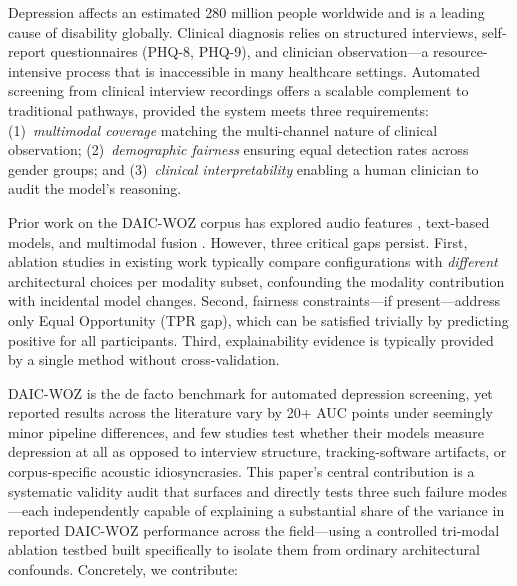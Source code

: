\documentclass[5p,twocolumn]{elsarticle}
\begin{document}
Depression affects an estimated 280 million people
worldwide \cite{who2023} and is a leading cause of disability globally.
Clinical diagnosis relies on structured interviews, self-report
questionnaires (PHQ-8, PHQ-9), and clinician observation---a
resource-intensive process that is inaccessible in many healthcare
settings. Automated screening from clinical interview recordings offers
a scalable complement to traditional pathways, provided the system
meets three requirements: (1)~\emph{multimodal coverage} matching the
multi-channel nature of clinical observation; (2)~\emph{demographic
fairness} ensuring equal detection rates across gender groups; and
(3)~\emph{clinical interpretability} enabling a human clinician to
audit the model's reasoning.

Prior work on the DAIC-WOZ corpus \cite{gratch2014} has explored
audio features \cite{ringeval2017}, text-based models, and multimodal
fusion \cite{gong2017,williamson2016}. However, three critical gaps
persist. First, ablation studies in existing work typically compare
configurations with \emph{different} architectural choices per modality
subset, confounding the modality contribution with incidental model
changes. Second, fairness constraints---if present---address only
Equal Opportunity (TPR gap), which can be satisfied trivially by
predicting positive for all participants. Third, explainability
evidence is typically provided by a single method without
cross-validation.

DAIC-WOZ is the de facto benchmark for automated depression screening,
yet reported results across the literature vary by 20+ AUC points
under seemingly minor pipeline differences, and few studies test
whether their models measure depression at all as opposed to
interview structure, tracking-software artifacts, or corpus-specific
acoustic idiosyncrasies. This paper's central contribution is a
systematic validity audit that surfaces and directly tests three
such failure modes---each independently capable of explaining a
substantial share of the variance in reported DAIC-WOZ performance
across the field---using a controlled tri-modal ablation testbed
built specifically to isolate them from ordinary architectural
confounds. Concretely, we contribute:
\end{document}
